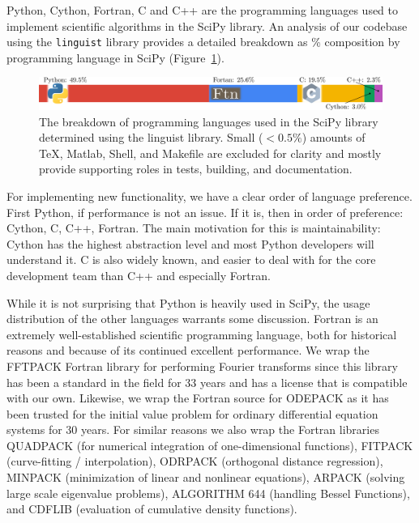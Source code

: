 \documentclass[fleqn,10pt]{wlscirep}
\begin{document}
Python, Cython, Fortran, C and C++ are the programming languages used to
implement scientific algorithms in the SciPy library. An analysis of our 
codebase using the \texttt{linguist} library\cite{linguistref} provides a 
detailed breakdown as \% composition by programming language in 
SciPy (Figure~\ref{fig:linguist}).

\begin{figure}[H]
    \centering
		\includegraphics[width=\textwidth]{static/composition}
    \caption{The breakdown of programming languages used in the
             SciPy library determined using the linguist library.
    	 Small ($<0.5 \%$) amounts of TeX, Matlab, Shell,
    	 and Makefile are excluded for clarity and mostly
    	 provide supporting roles in tests, building, and
    	 documentation.}
    \label{fig:linguist}
\end{figure}

For implementing new functionality, we have a clear order of language
preference.  First Python, if performance is not an issue. If it is, then in
order of preference: Cython, C, C++, Fortran. The main motivation for this is
maintainability: Cython has the highest abstraction level and most Python
developers will understand it. C is also widely known, and easier to deal with
for the core development team than C++ and especially Fortran.

While it is not surprising that Python is heavily used in SciPy, the usage
distribution of the other languages warrants some discussion. Fortran is an
extremely well-established scientific programming language, both for historical
reasons and because of its continued excellent
performance\cite{Koelbel:1993:HPF:562354}. We wrap the FFTPACK Fortran library
for performing Fourier transforms\cite{SWARZTRAUBER198445, SWARZTRAUBER198251}
since this library has been a standard in the field for 33 years and has a
license that is compatible with our own. Likewise, we wrap the Fortran source
for ODEPACK\cite{citeulike:2644528} as it has been  trusted for the initial
value problem for ordinary differential equation systems for 30 years. For
similar reasons we also wrap the Fortran libraries
QUADPACK\cite{1983qspa.book.....P} (for numerical integration of
one-dimensional functions), FITPACK\cite{Dierckx:1993:CSF:151103}
(curve-fitting / interpolation), ODRPACK\cite{ODRPACK_Boggs} (orthogonal
distance regression), MINPACK\cite{osti_6997568} (minimization of linear and
nonlinear equations), ARPACK\cite{leh:sor:yan96} (solving large scale
eigenvalue problems), ALGORITHM 644\cite{Amos:1986:APP:7921.214331} (handling
Bessel Functions), and CDFLIB\cite{CDFLIB_site} (evaluation of cumulative
density functions).
\end{document}
